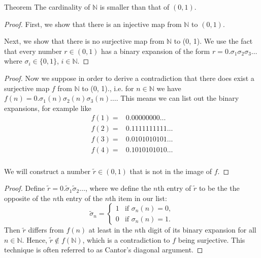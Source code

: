 \documentclass [aspectratio=169]{beamer}
\newcommand{\N}{{\mathbb{N}}}
\begin{document}
\begin{frame}
\begin{alertblock}{Theorem}
The cardinality of $\N$ is smaller than that of $(0,1)$.
\end{alertblock}
\begin{proof}
First, we show that there is an injective map from $\N$ to $(0, 1)$.

\vspace{2em} 

Next, we show that there is no surjective map from $\N$ to (0, 1). We use the fact that every number $r \in (0,1)$ has a binary expansion of the form $r=0.\sigma_1\sigma_2\sigma_3\ldots$ where $\sigma_i \in \{0, 1\}$, $i \in \N$.
\end{proof}
\end{frame}

\begin{frame}
\begin{proof}
Now we suppose in order to derive a contradiction that there does exist a surjective map $f$ from $\N$ to (0, 1)., i.e. for $n \in \N$ we have $f(n) = 0.\sigma_1(n)\sigma_2(n)\sigma_3(n)\ldots$. This means we can list out the binary expansions, for example like
\begin{align*}
f(1)= & 0.{0}0000000\ldots \\
f(2)=& 0.1{1}11111111\ldots\\
f(3)=& 0.01{0}1010101\ldots  \\
f(4)= & 0.101{0}101010\ldots  \\
& 
\end{align*}

We will construct a number $\tilde r \in (0,1)$ that is not in the image of $f$. 
\end{proof}
\end{frame}


\begin{frame}
\begin{proof}
Define $\tilde r = 0.\tilde\sigma_1 \tilde\sigma_2 \ldots$, where we define the $n$th entry of $\tilde r$ to be the the opposite of the  $n$th entry of the $n$th item in our list:
\begin{equation*}
    \tilde\sigma_n = \begin{cases} 1 & \text{if } \sigma_n(n) = 0, \\
    0 & \text{if }  \sigma_n(n) = 1.
    \end{cases}
\end{equation*}
Then $\tilde r$ differs from $f(n)$ at least in the $n$th digit of its binary expansion for all $n\in \N$. Hence, $\tilde r\not\in f(\N)$, which is a contradiction to $f$ being surjective. This technique is often referred to as Cantor's diagonal argument. 
\end{proof}
\end{frame}
\end{document}
